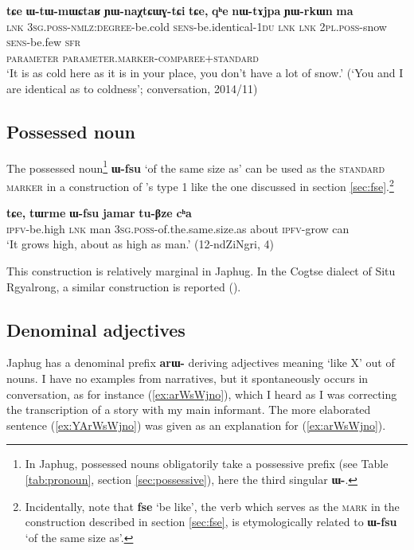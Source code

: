 \documentclass[oneside,a4paper,11pt]{article}
\newcommand{\ipa}[1]{{\phon\textbf{#1}}} %
\newcommand{\forme}[2]{\ipa{#1} `#2'}
\begin{document}
\begin{exe}
\ex \label{ex:WtWmWCtaR}
\glll
\ipa{tɕe} 	\ipa{ɯ-tɯ-mɯɕtaʁ} 	\ipa{ɲɯ-naχtɕɯɣ-tɕi} 	\ipa{tɕe,} 	\ipa{qʰe} 	\ipa{nɯ-tɤjpa} 	\ipa{ɲɯ-rkɯn} 	\ipa{ma} \\
\textsc{lnk} \textsc{3sg.poss-nmlz:degree}-be.cold \textsc{sens}-be.identical-\textsc{1du} \textsc{lnk} \textsc{lnk} \textsc{2pl.poss}-snow \textsc{sens}-be.few \textsc{sfr} \\
{ } \textsc{parameter} \textsc{parameter.marker-comparee+standard} \\
\glt `It is as cold here as it is in your place, you don't have a lot of snow.' (`You and I are identical as to coldness'; conversation, 2014/11)
\end{exe}



\subsection{Possessed noun} \label{sec:Wfsu}
The possessed noun\footnote{In Japhug, possessed nouns obligatorily take a possessive prefix (see Table \ref{tab:pronoun}, section \ref{sec:possessive}), here the third singular \ipa{ɯ-}. } \forme{ɯ-fsu}{of the same size as} can be used as the \textsc{standard marker} in a construction of \citet{haspelmath17equative}'s type 1 like the one discussed in section \ref{sec:fse}.\footnote{Incidentally, note that \forme{fse}{be like}, the verb which serves as the \textsc{mark} in the construction described in section \ref{sec:fse}, is etymologically related to \forme{ɯ-fsu}{of the same size as}.}

\begin{exe}
\ex \label{ex:Wfsu}
\gll \ipa{tu-mbro} 	\ipa{tɕe,} 	\ipa{tɯrme} 	\ipa{ɯ-fsu} 	\ipa{jamar} 	\ipa{tu-βze} 	\ipa{cʰa} \\
\textsc{ipfv}-be.high \textsc{lnk} man \textsc{3sg.poss}-of.the.same.size.as about \textsc{ipfv}-grow can \\
\glt `It grows high, about as high as man.' (12-ndZiNgri, 4)
\end{exe}

This construction is relatively marginal in Japhug. In the Cogtse dialect of Situ Rgyalrong, a similar construction is reported (\citealt[377]{linxr93jiarong}).

\subsection{Denominal adjectives} \label{sec:denominal}
Japhug has a denominal prefix \ipa{arɯ-} deriving adjectives meaning `like X' out of nouns. I have no examples from narratives, but it spontaneously occurs in conversation, as for instance (\ref{ex:arWsWjno}), which I heard as I was correcting the transcription of a story with my main informant. The more elaborated sentence (\ref{ex:YArWsWjno}) was given as an explanation for (\ref{ex:arWsWjno}).
\end{document}

